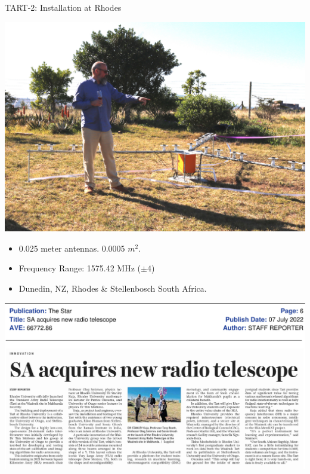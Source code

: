 \documentclass[ignorenonframetext]{beamer}
\begin{document}
\begin{frame}{TART-2: Installation at Rhodes}
\begin{center}
  \includegraphics[width=0.9\linewidth]{fig/rhodes_photo_array.jpg}
\end{center}
\begin{itemize}
 \item 0.025 meter antennas. 0.0005 $m^2$.
 \item Frequency Range: 1575.42 MHz ($\pm 4$)
 \item Dunedin, NZ, Rhodes \& Stellenbosch South Africa.
\end{itemize}
\end{frame}

\begin{frame}
\vspace{1cm}
  \includegraphics[width=\linewidth]{fig/rhodes_news_sa.jpg}
\end{frame}
\end{document}
